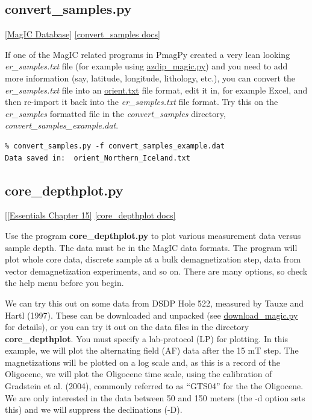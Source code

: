\documentclass[11pt]{book}
\begin{document}
{{\subsection{convert\_samples.py}
\href{#MagICDatabase}{[MagIC Database]}
\href{https://github.com/PmagPy/PmagPy/blob/master/programs/convert_samples.py}{[convert\_samples docs]}

If one of the MagIC related programs in PmagPy created a very lean looking {\it er\_samples.txt} file (for example using \href{#azdip_magic.py}{azdip\_magic.py}) and you need to add more information (say, latitude, longitude, lithology, etc.), you can convert the {\it er\_samples.txt} file into an \href{#orientation_magic.py}{orient.txt} file format, edit it in, for example Excel, and then re-import it back into the {\it er\_samples.txt} file format.  Try this on the {\it er\_samples} formatted file in the {\it convert\_samples} directory, {\it convert\_samples\_example.dat}.

\begin{verbatim}
% convert_samples.py -f convert_samples_example.dat
Data saved in:  orient_Northern_Iceland.txt
\end{verbatim}




\subsection{core\_depthplot.py} [\href{http://earthref.org/MAGIC/books/Tauxe/Essentials/WebBook3ch15.html#ch15}{[Essentials Chapter 15]}
\href{https://github.com/PmagPy/PmagPy/blob/master/programs/core_depthplot.py}{[core\_depthplot docs]}

Use the program {\bf core\_depthplot.py} to plot various measurement data versus sample depth.   The data must be in the MagIC data formats.  The program will plot whole core data, discrete sample at a bulk demagnetization step, data from vector demagnetization experiments, and so on.  There are many options, so check the help menu before you begin.

We can try this out on some data from DSDP Hole 522, measured by Tauxe and Hartl (1997).  \nocite{tauxe97}  These can be downloaded and unpacked (see \href{#download_magic.py}{download\_magic.py} for details),  or you can try it out on the data files in the directory {\bf core\_depthplot}.   You must specify a lab-protocol (LP) for plotting.  In this example, we will plot the alternating field (AF) data after the 15 mT step.  The magnetizations will be plotted on a log scale and, as this is a record of the Oligocene, we will plot the Oligocene time scale, using the calibration of Gradstein et al. (2004),  \nocite{gradstein04} commonly referred to as ``GTS04'' for the the Oligocene.  We are only interested in the data between 50 and 150 meters (the -d option sets this) and we will suppress the declinations (-D).

}}
\end{document}
